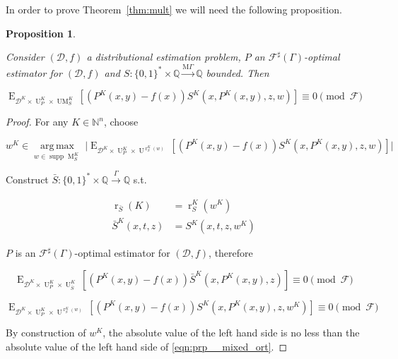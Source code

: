 \documentclass{article}
\numberwithin{equation}{section}
\theoremstyle{definition}
\theoremstyle{plain}
\newtheorem{proposition}{Proposition}[section]
\newcommand{\Bool}{\{0,1\}}
\newcommand{\Words}{{\Bool^*}}
\DeclareMathOperator{\Supp}{supp}
\DeclareMathOperator{\E}{E}
\DeclareMathOperator{\R}{r}
\DeclareMathOperator{\M}{M}
\DeclareMathOperator{\UM}{UM}
\DeclareMathOperator{\Un}{U}
\newcommand{\Argmax}[1]{\underset{#1}{\operatorname{arg\,max}}\,}
\newcommand{\Nats}{\mathbb{N}}
\newcommand{\Rats}{\mathbb{Q}}
\newcommand{\Abs}[1]{\lvert #1 \rvert}
\newcommand{\Dist}{\mathcal{D}}
\newcommand{\MGrow}{\mathrm{M}\Gamma}
\newcommand{\Fall}{\mathcal{F}}
\newcommand{\ESG}{\Fall^\sharp(\Gamma)}
\newcommand{\Scheme}{\xrightarrow{\Gamma}}
\newcommand{\MScheme}{\xrightarrow{\MGrow}}
\begin{document}
In order to prove Theorem~\ref{thm:mult} we will need the following proposition.

\begin{samepage}
\begin{proposition}
\label{prp:mixed_ort}

Consider $(\Dist,f)$ a distributional estimation problem, $P$ an $\ESG$-optimal estimator for $(\Dist,f)$ and $S: \Words \times \Rats \MScheme \Rats$ bounded. Then

\begin{equation}
\label{eqn:prp__mixed_ort}
\E_{\Dist^{K} \times \Un_P^{K} \times \UM_S^{K}}[(P^{K}(x,y) - f(x))S^{K}(x,P^{K}(x,y),z,w)] \equiv 0 \pmod \Fall
\end{equation}

\end{proposition}
\end{samepage}

\begin{proof}

For any $K \in \Nats^n$, choose 

$$w^{K} \in \Argmax{w \in \Supp \M_S^{K}} \Abs{\E_{\Dist^{K} \times \Un_P^{K} \times \Un^{\R_S^{K}(w)}}[(P^{K}(x,y) - f(x))S^{K}(x,P^{K}(x,y),z,w)]}$$

Construct $\bar{S}: \Words \times \Rats \Scheme \Rats$ s.t. 

\begin{align*}
\R_{\bar{S}}(K)&=\R_S^{K}(w^{K}) \\
\bar{S}^{K}(x,t,z)&=S^{K}(x,t,z,w^{K})
\end{align*}

$P$ is an $\ESG$-optimal estimator for $(\Dist,f)$, therefore

$$\E_{\Dist^{K} \times \Un_P^{K} \times \Un_{\bar{S}}^{K}}[(P^{K}(x,y) - f(x))\bar{S}^{K}(x,P^{K}(x,y),z)] \equiv 0 \pmod \Fall$$

$$\E_{\Dist^{K} \times \Un_P^{K} \times \Un^{\R_S^{K}(w)}}[(P^{K}(x,y) - f(x))S^{K}(x,P^{K}(x,y),z,w^{K})] \equiv 0 \pmod \Fall$$

By construction of $w^{K}$, the absolute value of the left hand side is no less than the absolute value of the left hand side of \ref{eqn:prp__mixed_ort}.
\end{proof}
\end{document}
